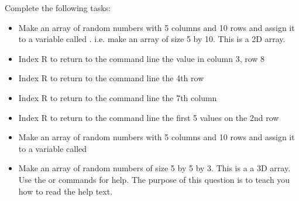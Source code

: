 \documentclass{article}
\begin{document}
Complete the following tasks:
\begin{itemize}
\item Make an array of random numbers with 5 columns and 10 rows and assign it to a variable called . i.e.
make an array of size 5 by 10. This is a 2D array.
\item Index R to return to the command line the value in column 3, row 8
\item Index R to return to the command line the 4th row
\item Index R to return to the command line the 7th column
\item Index R to return to the command line the first 5 values on the 2nd row
\item Make an array of random numbers  with 5 columns and 10 rows and assign it to a variable called 
\item Make an array of random numbers of size 5 by 5 by 3. This is a a 3D array. Use the  or  commands
for help. The purpose of this question is to teach you how to read the help text.
\end{itemize}
\end{document}
